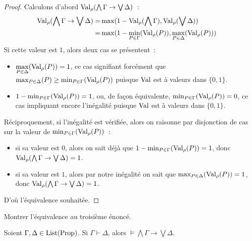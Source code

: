 \begin{proof}
  Calculons d'abord $\operatorname{Val}_\rho(\bigwedge\Gamma\to\bigvee\Delta)$~:
  \begin{align*}
    \operatorname{Val}_\rho(\bigwedge\Gamma\to\bigvee\Delta) =&
    \max(1 - \operatorname{Val}_\rho(\bigwedge\Gamma), \operatorname{Val}_\rho(\bigvee\Delta))\\
    =& \max(1 - \min_{P\in \Gamma}(\operatorname{Val}_\rho(P)),\max_{P\in\Delta}(\operatorname{Val}_\rho(P)))
  \end{align*}
  Si cette valeur est $1$, alors deux cas se présentent~:
  \begin{itemize}
  \item $\displaystyle\max_{P \in \Delta}(\operatorname{Val}_\rho(P)) = 1$, ce cas signifiant
    forcément que $\max_{P\in \Delta}(P) \geq \min_{P\in \Gamma}(\operatorname{Val}_\rho(P))$
    puisque $\operatorname{Val}$ est à valeurs dans $\{0,1\}$.
  \item $1 - \min_{P \in \Gamma}(\operatorname{Val}_\rho(P)) = 1$, ou, de façon équivalente,
    $\min_{P\in \Gamma}(\operatorname{Val}_\rho(P)) = 0$, ce cas impliquant encore l'inégalité
    puisque $\operatorname{Val}$ est à valeurs dans $\{0,1\}$.
  \end{itemize}
  Réciproquement, si l'inégalité est vérifiée, alors on raisonne par disjonction
  de cas sur la valeur de $\min_{P\in\Gamma}(\operatorname{Val}_\rho(P))$~:
  \begin{itemize}
  \item si sa valeur est $0$, alors on sait déjà que
    $1 - \min_{P \in \Gamma}(\operatorname{Val}_\rho(P)) = 1$, donc
    $\operatorname{Val}_\rho(\bigwedge \Gamma\to \bigvee \Delta) = 1$.
  \item si sa valeur est $1$, alors par notre inégalité on sait que
    $\max_{P\in\Delta}(\operatorname{Val}_\rho(P)) = 1$, donc
    $\operatorname{Val}_\rho(\bigwedge \Gamma\to \bigvee \Delta) = 1$.
  \end{itemize}

  D'où l'équivalence souhaitée.
\end{proof}

\begin{exercise}
  Montrer l'équivalence au troisième énoncé.
\end{exercise}

\begin{theorem}
  Soient $\Gamma,\Delta\in\operatorname{List}(\operatorname{Prop})$. Si $\Gamma\vdash\Delta$, alors
  $\models \bigwedge \Gamma\to \bigvee \Delta$.
\end{theorem}

